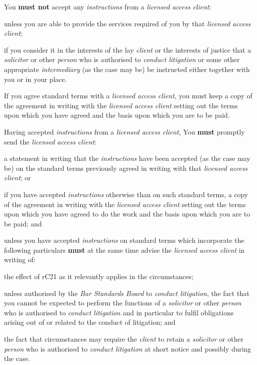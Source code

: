You \textcolor{myred}{\textbf{must not}} accept any \emph{instructions} from a \emph{licensed access
client}:
\begin{numlist}\item unless you are able to provide the services required of you by that
\emph{licensed access client};
\item if you consider it in the interests of the lay \emph{client} or the
interests of justice that a \emph{solicitor} or other \emph{person} who
is authorised to \emph{conduct litigation} or some other appropriate
\emph{intermediary} (as the case may be) be instructed either together
with you or in your place.
\end{numlist}

If you agree standard terms with a \emph{licensed access client}, you
must keep a copy of the agreement in writing with the \emph{licensed
access client} setting out the terms upon which you have agreed and the
basis upon which you are to be paid.


Having accepted \emph{instructions} from a \emph{licensed access
client}, You \textcolor{myred}{\textbf{must}} promptly send the \emph{licensed access client}:
\begin{numlist}
\item a statement in writing that the \emph{instructions} have been
accepted (as the case may be) on the standard terms previously agreed in
writing with that \emph{licensed access client}; or

\item if you have accepted \emph{instructions} otherwise than on such
standard terms, a copy of the agreement in writing with the
\emph{licensed access client} setting out the terms upon which you have
agreed to do the work and the basis upon which you are to be paid; and

\item unless you have accepted \emph{instructions} on standard terms which
incorporate the following particulars \textcolor{myred}{\textbf{must}} at the same time advise the
\emph{licensed access client} in writing of:
\begin{alphlist}
\item the effect of rC21 as it relevantly applies in the circumstances;

\item unless authorised by the \emph{Bar Standards Board} to \emph{conduct
litigation}, the fact that you cannot be expected to perform the
functions of a \emph{solicitor} or other \emph{person} who is authorised
to \emph{conduct litigation} and in particular to fulfil obligations
arising out of or related to the conduct of litigation; and

\item the fact that circumstances may require the \emph{client} to retain a
\emph{solicitor} or other \emph{person} who is authorised to
\emph{conduct litigation} at short notice and possibly during the case.
\end{alphlist}\end{numlist}

